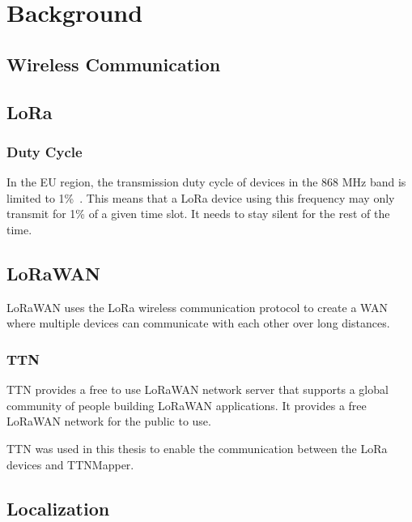 \chapter{Background}

\section{Wireless Communication}
\section{\acf{LoRa}}


\subsection{Duty Cycle}


In the \ac{EU} region, the transmission duty cycle of devices in the 868 MHz band is limited to 1\%~\cite{etsi_etsi_2012}.
This means that a \ac{LoRa} device using this frequency may only transmit for 1\% of a given time slot.
It needs to stay silent for the rest of the time.

\section{\acf{LoRaWAN}}

\ac{LoRaWAN} uses the LoRa wireless communication protocol to create a \ac{WAN} where multiple devices can communicate with each other over long distances.

\subsection{\acf{TTN}}

\ac{TTN} provides a free to use LoRaWAN network server that supports a global community of people building \ac{LoRaWAN} applications.
It provides a free \ac{LoRaWAN} network for the public to use.

\ac{TTN} was used in this thesis to enable the communication between the \ac{LoRa} devices and TTNMapper.


\section{Localization}

